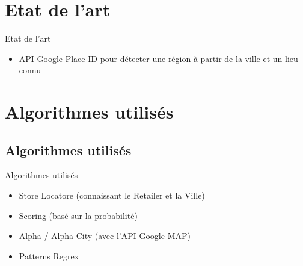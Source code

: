 \documentclass{beamer}
\begin{document}
\section{Etat de l'art}
\begin{frame}{Etat de l'art}
\begin{itemize}
		\item API Google Place ID pour détecter une région à partir de la ville et un lieu connu
\end{itemize}
\end{frame} 

\section{Algorithmes utilisés}
\subsection{Algorithmes utilisés}
\begin{frame}{Algorithmes utilisés}
\begin{itemize}
		\item Store Locatore (connaissant le Retailer et la Ville)
		\item Scoring (basé sur la probabilité)
		\item Alpha / Alpha City (avec l'API Google MAP)
		\item Patterns Regrex 
		
\end{itemize}
\end{frame} 
\end{document}
